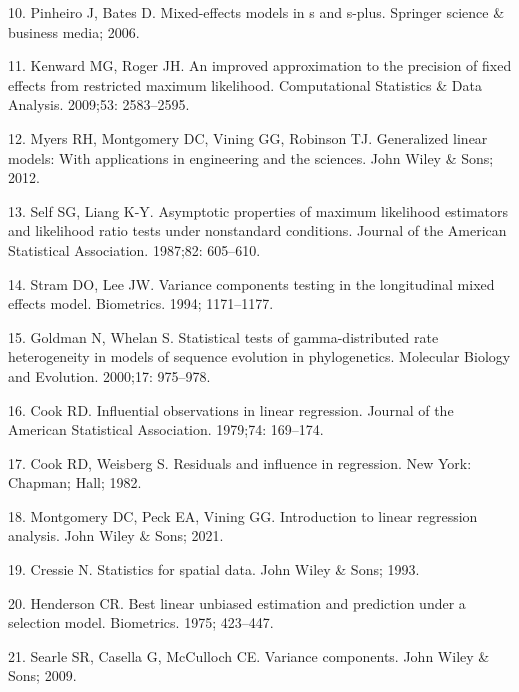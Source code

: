 \documentclass[10pt,letterpaper]{article}
\begin{document}
\leavevmode\hypertarget{ref-pinheiro2006mixed}{}%
10. Pinheiro J, Bates D. Mixed-effects models in s and s-plus. Springer
science \& business media; 2006.

\leavevmode\hypertarget{ref-kenward2009improved}{}%
11. Kenward MG, Roger JH. An improved approximation to the precision of
fixed effects from restricted maximum likelihood. Computational
Statistics \& Data Analysis. 2009;53: 2583--2595.

\leavevmode\hypertarget{ref-myers2012generalized}{}%
12. Myers RH, Montgomery DC, Vining GG, Robinson TJ. Generalized linear
models: With applications in engineering and the sciences. John Wiley \&
Sons; 2012.

\leavevmode\hypertarget{ref-self1987asymptotic}{}%
13. Self SG, Liang K-Y. Asymptotic properties of maximum likelihood
estimators and likelihood ratio tests under nonstandard conditions.
Journal of the American Statistical Association. 1987;82: 605--610.

\leavevmode\hypertarget{ref-stram1994variance}{}%
14. Stram DO, Lee JW. Variance components testing in the longitudinal
mixed effects model. Biometrics. 1994; 1171--1177.

\leavevmode\hypertarget{ref-goldman2000statistical}{}%
15. Goldman N, Whelan S. Statistical tests of gamma-distributed rate
heterogeneity in models of sequence evolution in phylogenetics.
Molecular Biology and Evolution. 2000;17: 975--978.

\leavevmode\hypertarget{ref-cook1979influential}{}%
16. Cook RD. Influential observations in linear regression. Journal of
the American Statistical Association. 1979;74: 169--174.

\leavevmode\hypertarget{ref-cook1982residuals}{}%
17. Cook RD, Weisberg S. Residuals and influence in regression. New
York: Chapman; Hall; 1982.

\leavevmode\hypertarget{ref-montgomery2021introduction}{}%
18. Montgomery DC, Peck EA, Vining GG. Introduction to linear regression
analysis. John Wiley \& Sons; 2021.

\leavevmode\hypertarget{ref-cressie1993statistics}{}%
19. Cressie N. Statistics for spatial data. John Wiley \& Sons; 1993.

\leavevmode\hypertarget{ref-henderson1975best}{}%
20. Henderson CR. Best linear unbiased estimation and prediction under a
selection model. Biometrics. 1975; 423--447.

\leavevmode\hypertarget{ref-searle2009variance}{}%
21. Searle SR, Casella G, McCulloch CE. Variance components. John Wiley
\& Sons; 2009.
\end{document}
